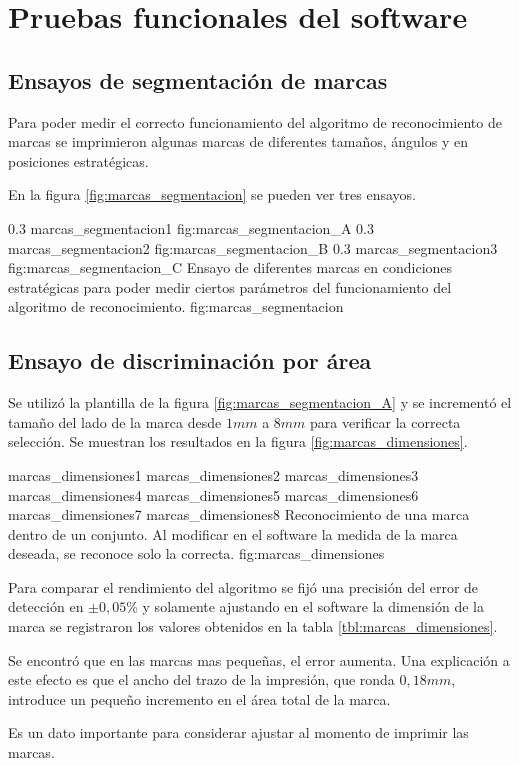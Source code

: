\section{Pruebas funcionales del software}
\label{sec:pruebasHW}

\subsection{Ensayos de segmentación de marcas}
Para poder medir el correcto funcionamiento del algoritmo de reconocimiento de marcas se imprimieron algunas marcas de diferentes tamaños, ángulos y en posiciones estratégicas.\par
En la figura \ref{fig:marcas_segmentacion} se pueden ver tres ensayos.

   \subfigabc
   {0.3} {marcas_segmentacion1} {} {fig:marcas_segmentacion_A}
   {0.3} {marcas_segmentacion2} {} {fig:marcas_segmentacion_B}
   {0.3} {marcas_segmentacion3} {} {fig:marcas_segmentacion_C}
   {Ensayo de diferentes marcas en condiciones estratégicas para poder medir ciertos parámetros del funcionamiento del algoritmo de reconocimiento.}
   {fig:marcas_segmentacion}

\subsection{Ensayo de discriminación por área}

Se utilizó la plantilla de la figura \ref{fig:marcas_segmentacion_A} y se incrementó el tamaño del lado de la marca desde $1mm$ a $8mm$ para verificar la correcta selección. Se muestran los resultados en la figura \ref{fig:marcas_dimensiones}.

\subfigfourfour
   {marcas_dimensiones1}
   {marcas_dimensiones2}
   {marcas_dimensiones3}
   {marcas_dimensiones4}
   {marcas_dimensiones5}
   {marcas_dimensiones6}
   {marcas_dimensiones7}
   {marcas_dimensiones8}
   {Reconocimiento de una marca dentro de un conjunto. Al modificar en el software la medida de la marca deseada, se reconoce solo la correcta.}
   {fig:marcas_dimensiones}

   Para comparar el rendimiento del algoritmo se fijó una precisión del error de detección en $\pm0,05$\% y solamente ajustando en el software la dimensión de la marca se registraron los valores obtenidos en la tabla \ref{tbl:marcas_dimensiones}.\par

Se encontró que en las marcas mas pequeñas, el error aumenta. Una explicación a este efecto es que el ancho del trazo de la impresión, que ronda $0,18mm$, introduce un pequeño incremento en el área total de la marca. \par
Es un dato importante para considerar ajustar al momento de imprimir las marcas.

